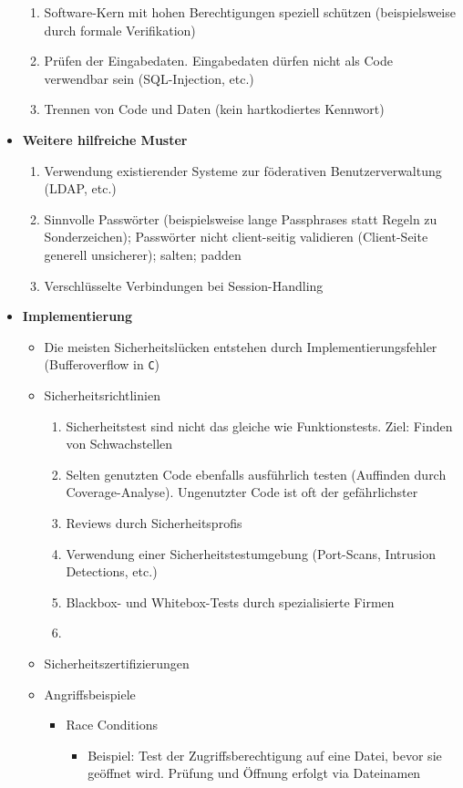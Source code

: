 \begin{itemize}
\begin{enumerate}
		\item Software-Kern mit hohen Berechtigungen speziell schützen (beispielsweise durch formale Verifikation)
		\item Prüfen der Eingabedaten. Eingabedaten dürfen nicht als Code verwendbar sein (SQL-Injection, etc.)
		\item Trennen von Code und Daten (kein hartkodiertes Kennwort)
	\end{enumerate}
	\item \textbf{Weitere hilfreiche Muster}
	\begin{enumerate}
		\item Verwendung existierender Systeme zur föderativen Benutzerverwaltung (LDAP, etc.)
		\item Sinnvolle Passwörter (beispielsweise lange Passphrases statt Regeln zu Sonderzeichen); Passwörter nicht client-seitig validieren (Client-Seite generell unsicherer); salten; padden
		\item Verschlüsselte Verbindungen bei Session-Handling
	\end{enumerate}
	\item \textbf{Implementierung}
	\begin{itemize}
		\item Die meisten Sicherheitslücken entstehen durch Implementierungsfehler (Bufferoverflow in \texttt{C})
		\item Sicherheitsrichtlinien
		\begin{enumerate}
			\item Sicherheitstest sind nicht das gleiche wie Funktionstests. Ziel: Finden von Schwachstellen
			\item Selten genutzten Code ebenfalls ausführlich testen (Auffinden durch Coverage-Analyse). Ungenutzter Code ist oft der gefährlichster
			\item Reviews durch Sicherheitsprofis
			\item Verwendung einer Sicherheitstestumgebung (Port-Scans, Intrusion Detections, etc.)
			\item Blackbox- und Whitebox-Tests durch spezialisierte Firmen
			\item 
		\end{enumerate}
		\item Sicherheitszertifizierungen
		\item Angriffsbeispiele
		\begin{itemize}
			\item Race Conditions
			\begin{itemize}
				\item Beispiel: Test der Zugriffsberechtigung auf eine Datei, bevor sie geöffnet wird. Prüfung und Öffnung erfolgt via Dateinamen

\end{itemize}
\end{itemize}
\end{itemize}
\end{itemize}
